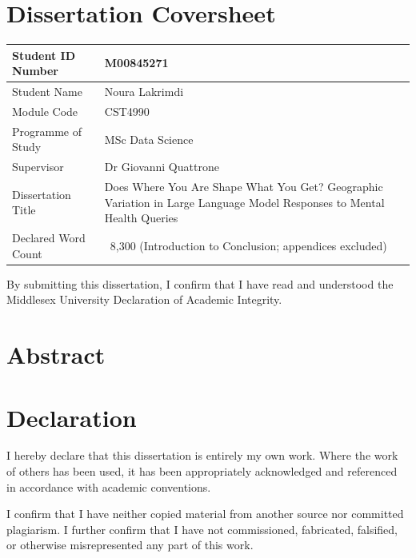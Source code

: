\documentclass[12pt,a4paper,oneside]{report}
\begin{document}

\chapter*{Dissertation Coversheet}

\begin{table}[H]
\centering
\begin{tabular}{|p{5cm}|p{9cm}|}
\hline
Student ID Number & M00845271\\ \hline
Student Name & Noura Lakrimdi \\ \hline
Module Code & CST4990 \\ \hline
Programme of Study & MSc Data Science \\ \hline
Supervisor & Dr Giovanni Quattrone \\ \hline
Dissertation Title & Does Where You Are Shape What You Get? Geographic Variation in Large Language Model Responses to Mental Health Queries \\ \hline
Declared Word Count & ~8,300 (Introduction to Conclusion; appendices excluded) \\ \hline
\end{tabular}
\end{table}

By submitting this dissertation, I confirm that I have read and understood the Middlesex University Declaration of Academic Integrity.

\clearpage

\chapter*{Abstract}


\clearpage

\chapter*{Declaration}

I hereby declare that this dissertation is entirely my own work. Where the work of others has been used, it has been appropriately acknowledged and referenced in accordance with academic conventions.

I confirm that I have neither copied material from another source nor committed plagiarism. I further confirm that I have not commissioned, fabricated, falsified, or otherwise misrepresented any part of this work.
\end{document}
